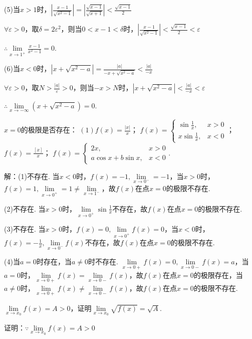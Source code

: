 \documentclass[12pt,UTF8]{ctexart}
\begin{document}
\begin{enumerate}
(5)当$x>1$时，$|\frac{x-1}{\sqrt{x^2-1}}|=|\frac{\sqrt{x-1}}{\sqrt{x+1}}|<\frac{\sqrt{x-1}}2$

$\forall\varepsilon>0$，取$\delta=2\varepsilon^2$，则当$0<x-1<\delta$时，$|\frac{x-1}{\sqrt{x^2-1}}|<\frac{\sqrt{x-1}}2<\varepsilon$

$\therefore\lim\limits_{x\rightarrow1^+}\frac{x-1}{x^2-1}=0$.

(6)当$x<0$时，$|x+\sqrt{x^2-a}|=\frac{|a|}{-x+\sqrt{x^2-a}}<\frac{|a|}{-x}$

$\forall\varepsilon>0$，取$N>\frac{|a|}\varepsilon>0$，则当$-x>N$时，$|x+\sqrt{x^2-a}|<\frac{|a|}{-x}<\varepsilon$

$\therefore\lim\limits_{x\rightarrow-\infty}(x+\sqrt{x^2-a})=0$.

$x=0$的极限是否存在：
\newline
$(1)f(x)=\frac{|x|}x$；
\newline
$f(x)=\begin{cases}\sin\frac1x,&x>0\\
x\sin\frac1x,&x<0
\end{cases}$；
\newline
$f(x)=\frac{[x]}x$；
\newline
$f(x)=\begin{cases}
2x,&x>0\\
a\cos x+b\sin x,&x<0
\end{cases}$.

解：(1)不存在. 当$x<0$时，$f(x)=-1,\lim\limits_{x\rightarrow0^-}=-1$，当$x>0$时，$f(x)=1,\lim\limits_{x\rightarrow0^+}=1\neq\lim\limits_{x\rightarrow1^-}$，故$f(x)$在点$x=0$的极限不存在.

(2)不存在. 当$x>0$时，$\lim\limits_{x\rightarrow0^+}\sin\frac1x$不存在，故$f(x)$在点$x=0$的极限不存在.

(3)不存在. 当$x>0$时，$f(x)=0,\lim\limits_{x\rightarrow0^+}f(x)=0$，当$x<0$时，$f(x)=-\frac1x,\lim\limits_{x\rightarrow0^-}f(x)$不存在，故$f(x)$在点$x=0$的极限不存在.

(4)当$a=0$时存在，当$a\neq0$时不存在. $\lim\limits_{x\rightarrow0+}f(x)=0,\lim\limits_{x\rightarrow0-}f(x)=a$，当$a=0$时，$\lim\limits_{x\rightarrow0+}f(x)=\lim\limits_{x\rightarrow0-}f(x)$，故$f(x)$在点$x=0$的极限存在，当$a\neq0$时，$\lim\limits_{x\rightarrow0+}f(x)\neq\lim\limits_{x\rightarrow0-}f(x)$，故$f(x)$在点$x=0$的极限不存在.

$\lim\limits_{x\rightarrow x_0}f(x)=A>0$，证明$\lim\limits_{x\rightarrow x_0}\sqrt{f(x)}=\sqrt A$.

证明：$\because\lim\limits_{x\rightarrow x_0}f(x)=A>0$


\end{enumerate}
\end{document}
